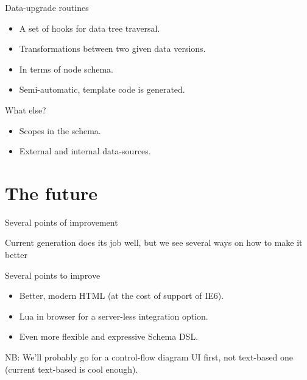 \documentclass[handout]{beamer}
\begin{document}

\begin{frame}{Data-upgrade routines}

\begin{itemize}
\item A set of hooks for data tree traversal.
\item Transformations between two given data versions.
\item In terms of node schema.
\item Semi-automatic, template code is generated.
\end{itemize}

\end{frame}


\begin{frame}{What else?}

\begin{itemize}
\item Scopes in the schema.
\item External and internal data-sources.
\end{itemize}

\end{frame}


\section{The future}

\begin{frame}{Several points of improvement}

Current generation does its job well, but we see several ways on how to make it better

Several points to improve

\begin{itemize}
\item Better, modern HTML (at the cost of support of IE6).
\item Lua in browser for a server-less integration option.
\item Even more flexible and expressive Schema DSL.
\end{itemize}

NB: We'll probably go for a control-flow diagram UI first, not text-based one (current text-based is cool enough).

\end{frame}
\end{document}
